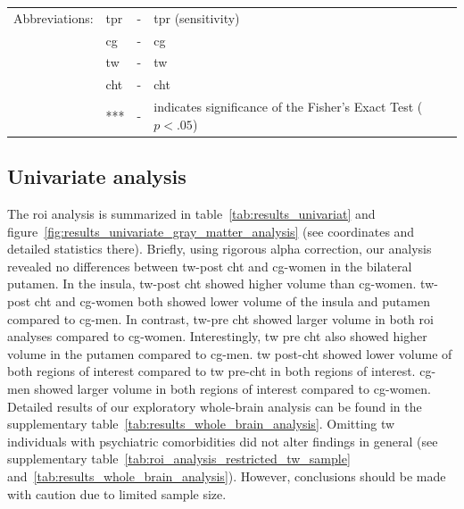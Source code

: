 \documentclass{article}
\begin{document}
\begin{table}[ht]
{        \vspace{-6pt}
        \setlength{\tabcolsep}{4pt}
            \begin{tabular}{llll}
                \hspace{-6pt} Abbreviations: & \ac{tpr}  & - & \acl{tpr} (sensitivity)                                       \\
                & \acs{cg}  & - & \acl{cg}                                                      \\
                & \acs{tw}  & - & \acl{tw}                                                      \\
                & \acs{cht} & - & \acl{cht}                                                     \\
                & ***       & - & indicates significance of the Fisher's Exact Test ($p < .05$)
            \end{tabular}
        }
        \label{tab:classification_res_appl}
    \end{table}

    \subsection{Univariate analysis}
    The \acl{roi} analysis is summarized in table~\ref{tab:results_univariat} and figure~\ref{fig:results_univariate_gray_matter_analysis} (see coordinates and detailed statistics there). Briefly, using rigorous alpha correction, our analysis revealed no differences between \ac{tw}-post \ac{cht} and \ac{cg}-women in the bilateral putamen. In the insula, \ac{tw}-post \ac{cht} showed higher volume than \ac{cg}-women. \ac{tw}-post \ac{cht} and \ac{cg}-women both showed lower volume of the insula and putamen compared to \ac{cg}-men.
    In contrast, \ac{tw}-pre \ac{cht} showed larger volume in both \ac{roi} analyses compared to \ac{cg}-women. Interestingly, \ac{tw} pre \ac{cht} also showed higher volume in the putamen compared to \ac{cg}-men.
    \ac{tw} post-\ac{cht} showed lower volume of both regions of interest compared to \ac{tw} pre-\ac{cht} in both regions of interest. \ac{cg}-men showed larger volume in both regions of interest compared to \ac{cg}-women.
    Detailed results of our exploratory whole-brain analysis can be found in the supplementary table~\ref{tab:results_whole_brain_analysis}. Omitting \ac{tw} individuals with psychiatric comorbidities did not alter findings in general (see supplementary table~\ref{tab:roi_analysis_restricted_tw_sample} and~\ref{tab:results_whole_brain_analysis}). However, conclusions should be made with caution due to limited sample size.
\end{document}
